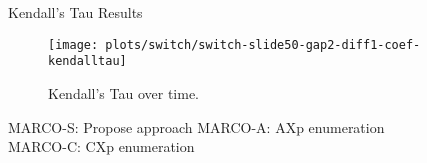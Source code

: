 \begin{frame}{Kendall's Tau Results}
	\begin{figure}[!t]
		\centering
	    \texttt{[image: plots/switch/switch-slide50-gap2-diff1-coef-kendalltau]}
	    \caption{Kendall's Tau over time.}
	    \label{fig:tau}
	     \end{figure}
		{\large{} \color{orange}\normalsize MARCO-S}: Propose approach
		{\large{} \color{orange}\normalsize MARCO-A}: AXp enumeration  \\   
		{\large{} \color{orange}\normalsize MARCO-C}: CXp enumeration
\end{frame}


